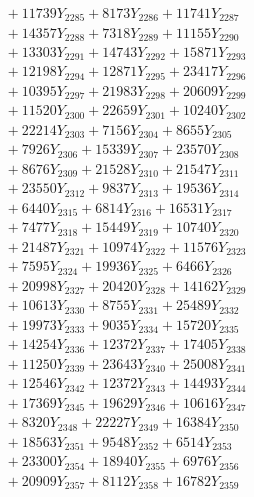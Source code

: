 \documentclass[a4paper,10pt]{article}
\begin{document}
{\begin{align}
&\;  + 11739 Y_{2285} + 8173 Y_{2286} + 11741 Y_{2287} \\[0.3ex]
&\;  + 14357 Y_{2288} + 7318 Y_{2289} + 11155 Y_{2290} \\[0.3ex]
&\;  + 13303 Y_{2291} + 14743 Y_{2292} + 15871 Y_{2293} \\[0.3ex]
&\;  + 12198 Y_{2294} + 12871 Y_{2295} + 23417 Y_{2296} \\[0.3ex]
&\;  + 10395 Y_{2297} + 21983 Y_{2298} + 20609 Y_{2299} \\[0.3ex]
&\;  + 11520 Y_{2300} + 22659 Y_{2301} + 10240 Y_{2302} \\[0.3ex]
&\;  + 22214 Y_{2303} + 7156 Y_{2304} + 8655 Y_{2305} \\[0.3ex]
&\;  + 7926 Y_{2306} + 15339 Y_{2307} + 23570 Y_{2308} \\[0.5ex]\allowbreak
&\;  + 8676 Y_{2309} + 21528 Y_{2310} + 21547 Y_{2311} \\[0.3ex]
&\;  + 23550 Y_{2312} + 9837 Y_{2313} + 19536 Y_{2314} \\[0.3ex]
&\;  + 6440 Y_{2315} + 6814 Y_{2316} + 16531 Y_{2317} \\[0.3ex]
&\;  + 7477 Y_{2318} + 15449 Y_{2319} + 10740 Y_{2320} \\[0.3ex]
&\;  + 21487 Y_{2321} + 10974 Y_{2322} + 11576 Y_{2323} \\[0.3ex]
&\;  + 7595 Y_{2324} + 19936 Y_{2325} + 6466 Y_{2326} \\[0.3ex]
&\;  + 20998 Y_{2327} + 20420 Y_{2328} + 14162 Y_{2329} \\[0.3ex]
&\;  + 10613 Y_{2330} + 8755 Y_{2331} + 25489 Y_{2332} \\[0.3ex]
&\;  + 19973 Y_{2333} + 9035 Y_{2334} + 15720 Y_{2335} \\[0.3ex]
&\;  + 14254 Y_{2336} + 12372 Y_{2337} + 17405 Y_{2338} \\[0.5ex]\allowbreak
&\;  + 11250 Y_{2339} + 23643 Y_{2340} + 25008 Y_{2341} \\[0.3ex]
&\;  + 12546 Y_{2342} + 12372 Y_{2343} + 14493 Y_{2344} \\[0.3ex]
&\;  + 17369 Y_{2345} + 19629 Y_{2346} + 10616 Y_{2347} \\[0.3ex]
&\;  + 8320 Y_{2348} + 22227 Y_{2349} + 16384 Y_{2350} \\[0.3ex]
&\;  + 18563 Y_{2351} + 9548 Y_{2352} + 6514 Y_{2353} \\[0.3ex]
&\;  + 23300 Y_{2354} + 18940 Y_{2355} + 6976 Y_{2356} \\[0.3ex]
&\;  + 20909 Y_{2357} + 8112 Y_{2358} + 16782 Y_{2359} \\[0.3ex]

\end{align}}
\end{document}
